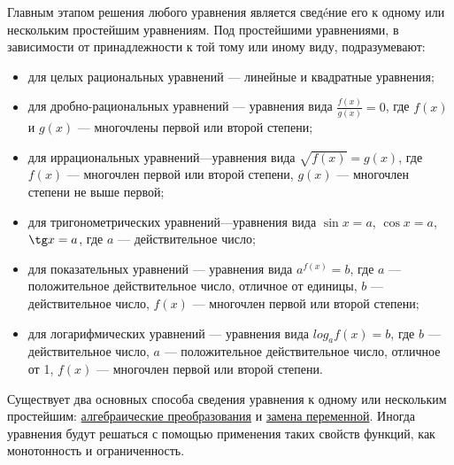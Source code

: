 \documentclass[12pt, a4paper]{article}
\begin{document}
Главным этапом решения любого уравнения является свед\'eние его к одному или нескольким простейшим уравнениям. Под простейшими уравнениями, в зависимости от принадлежности к той тому или иному виду, подразумевают:
\begin{itemize}
	\item для целых рациональных уравнений — линейные и квадратные уравнения;
	\item для дробно-рациональных уравнений — уравнения вида $\frac{f(x)}{g(x)}=0$, где $f(x)$ и $g(x)$ — многочлены первой или второй степени;
	\item для иррациональных уравнений—уравнения вида $\sqrt{f(x)}=g(x)$, где $f(x)$ — многочлен первой или второй степени, $g(x)$ — многочлен
	степени не выше первой;
	\item для тригонометрических уравнений—уравнения вида $\sin x =a$,
	$\cos x=a$, $\tg x =a$, где $a$ — действительное число;
	\item для показательных уравнений — уравнения вида $a^{f(x)} = b$, где
	$a$ — положительное действительное число, отличное от единицы, $b$ —
	действительное число, $f(x)$ — многочлен первой или второй степени;
	\item  для логарифмических уравнений — уравнения вида $log_a {f(x)}=b$,
	где $b$ — действительное число, $a$ — положительное действительное
	число, отличное от 1, $f(x)$ — многочлен первой или второй степени.
\end{itemize}

Существует два основных способа сведения уравнения к одному или нескольким простейшим: \underline{алгебраические преобразования} и \underline{замена переменной}. Иногда уравнения будут решаться с помощью применения таких свойств функций, как монотонность и ограниченность.
\end{document}
